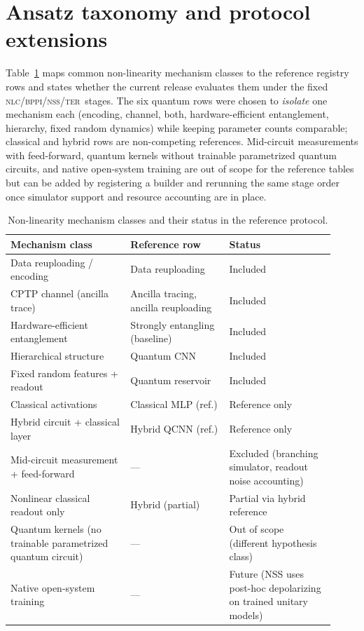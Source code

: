 \documentclass{article}
\newcommand{\nlc}{\textsc{nlc}}
\newcommand{\bppi}{\textsc{bppi}}
\newcommand{\nss}{\textsc{nss}}
\newcommand{\ter}{\textsc{ter}}
\newcommand{\pqc}{parametrized quantum circuit}
\newcommand{\pqcs}{parametrized quantum circuits}
\begin{document}
\section{Ansatz taxonomy and protocol extensions}
\label{app:ansatz-taxonomy}

Table~\ref{tab:ansatz-taxonomy} maps common non-linearity mechanism classes to the reference registry rows and states whether the current release evaluates them under the fixed \nlc/\bppi/\nss/\ter\ stages.
The six quantum rows were chosen to \emph{isolate} one mechanism each (encoding, channel, both, hardware-efficient entanglement, hierarchy, fixed random dynamics) while keeping parameter counts comparable; classical and hybrid rows are non-competing references.
Mid-circuit measurements with feed-forward, quantum kernels without trainable \pqcs, and native open-system training are out of scope for the reference tables but can be added by registering a builder and rerunning the same stage order once simulator support and resource accounting are in place.

\begin{table}[t]
  \caption{Non-linearity mechanism classes and their status in the reference protocol.}
  \label{tab:ansatz-taxonomy}
  \centering
  \footnotesize
  \begin{tabular}{p{0.34\linewidth}p{0.28\linewidth}p{0.30\linewidth}}
    \toprule
    Mechanism class & Reference row & Status \\
    \midrule
    Data reuploading / encoding & Data reuploading & Included \\
    CPTP channel (ancilla trace) & Ancilla tracing, ancilla reuploading & Included \\
    Hardware-efficient entanglement & Strongly entangling (baseline) & Included \\
    Hierarchical structure & Quantum CNN & Included \\
    Fixed random features + readout & Quantum reservoir & Included \\
    Classical activations & Classical MLP (ref.) & Reference only \\
    Hybrid circuit + classical layer & Hybrid QCNN (ref.) & Reference only \\
  \midrule
    Mid-circuit measurement + feed-forward & --- & Excluded (branching simulator, readout noise accounting) \\
    Nonlinear classical readout only & Hybrid (partial) & Partial via hybrid reference \\
    Quantum kernels (no trainable \pqc) & --- & Out of scope (different hypothesis class) \\
    Native open-system training & --- & Future (NSS uses post-hoc depolarizing on trained unitary models) \\
    \bottomrule
  \end{tabular}
\end{table}
\end{document}

